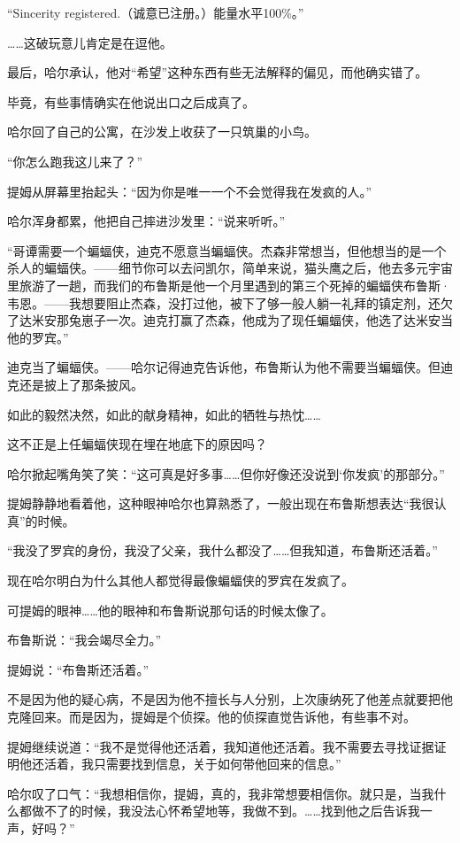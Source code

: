 \documentclass[../main]{subfiles}
\begin{document}
“Sincerity registered.（诚意已注册。）能量水平100\%。”

……这破玩意儿肯定是在逗他。

最后，哈尔承认，他对“希望”这种东西有些无法解释的偏见，而他确实错了。

毕竟，有些事情确实在他说出口之后成真了。

哈尔回了自己的公寓，在沙发上收获了一只筑巢的小鸟。

“你怎么跑我这儿来了？”

提姆从屏幕里抬起头：“因为你是唯一一个不会觉得我在发疯的人。”

哈尔浑身都累，他把自己摔进沙发里：“说来听听。”

“哥谭需要一个蝙蝠侠，迪克不愿意当蝙蝠侠。杰森非常想当，但他想当的是一个杀人的蝙蝠侠。——细节你可以去问凯尔，简单来说，猫头鹰之后，他去多元宇宙里旅游了一趟，而我们的布鲁斯是他一个月里遇到的第三个死掉的蝙蝠侠布鲁斯·韦恩。——我想要阻止杰森，没打过他，被下了够一般人躺一礼拜的镇定剂，还欠了达米安那兔崽子一次。迪克打赢了杰森，他成为了现任蝙蝠侠，他选了达米安当他的罗宾。”

迪克当了蝙蝠侠。——哈尔记得迪克告诉他，布鲁斯认为他不需要当蝙蝠侠。但迪克还是披上了那条披风。

如此的毅然决然，如此的献身精神，如此的牺牲与热忱……

这不正是上任蝙蝠侠现在埋在地底下的原因吗？

哈尔掀起嘴角笑了笑：“这可真是好多事……但你好像还没说到`你发疯'的那部分。”

提姆静静地看着他，这种眼神哈尔也算熟悉了，一般出现在布鲁斯想表达“我很认真”的时候。

“我没了罗宾的身份，我没了父亲，我什么都没了……但我知道，布鲁斯还活着。”

现在哈尔明白为什么其他人都觉得最像蝙蝠侠的罗宾在发疯了。

可提姆的眼神……他的眼神和布鲁斯说那句话的时候太像了。

布鲁斯说：“我会竭尽全力。”

提姆说：“布鲁斯还活着。”

不是因为他的疑心病，不是因为他不擅长与人分别，上次康纳死了他差点就要把他克隆回来。而是因为，提姆是个侦探。他的侦探直觉告诉他，有些事不对。

提姆继续说道：“我不是觉得他还活着，我知道他还活着。我不需要去寻找证据证明他还活着，我只需要找到信息，关于如何带他回来的信息。”

哈尔叹了口气：“我想相信你，提姆，真的，我非常想要相信你。就只是，当我什么都做不了的时候，我没法心怀希望地等，我做不到。……找到他之后告诉我一声，好吗？”
\end{document}
